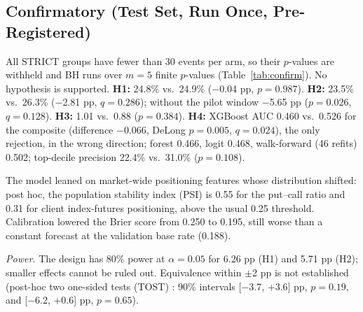 \documentclass[conference]{IEEEtran}
\newcommand{\HOneExp}{24.8}
\newcommand{\HOneRest}{24.9}
\newcommand{\HOneDiff}{\ensuremath{-}0.04}
\newcommand{\HOneP}{0.987}
\newcommand{\HTwoExp}{23.5}
\newcommand{\HTwoRest}{26.3}
\newcommand{\HTwoDiff}{\ensuremath{-}2.81}
\newcommand{\HTwoQ}{0.286}
\newcommand{\HThreeExp}{1.01}
\newcommand{\HThreeRest}{0.88}
\newcommand{\HThreeP}{0.384}
\newcommand{\AUCxgb}{0.460}
\newcommand{\AUCrf}{0.466}
\newcommand{\AUClogit}{0.468}
\newcommand{\AUCcomp}{0.526}
\newcommand{\HFourDiff}{\ensuremath{-}0.066}
\newcommand{\HFourP}{0.005}
\newcommand{\HFourQ}{0.024}
\newcommand{\TopMLPrec}{22.4}
\newcommand{\TopCompPrec}{31.0}
\newcommand{\TopP}{0.108}
\newcommand{\BrierRaw}{0.250}
\newcommand{\BrierCal}{0.195}
\newcommand{\WFAUC}{0.502}
\newcommand{\WFMonths}{46}
\newcommand{\NPHTwoDiff}{\ensuremath{-}5.65}
\newcommand{\NPHTwoP}{0.026}
\newcommand{\NPHTwoQ}{0.128}
\newcommand{\BHm}{5}
\newcommand{\TostHOneLo}{\ensuremath{-}3.7}
\newcommand{\TostHOneHi}{+3.6}
\newcommand{\TostHOneP}{0.19}
\newcommand{\TostHTwoLo}{\ensuremath{-}6.2}
\newcommand{\TostHTwoHi}{+0.6}
\newcommand{\TostHTwoP}{0.65}
\newcommand{\MDEHOne}{6.26}
\newcommand{\MDEHTwo}{5.71}
\newcommand{\PSIpcr}{0.55}
\newcommand{\PSIclient}{0.31}
\newcommand{\BrierConstVal}{0.188}
\begin{document}
\subsection{Confirmatory (Test Set, Run Once, Pre-Registered)}
All STRICT groups have fewer than 30 events per arm, so their $p$-values are withheld and BH runs over
$m=\BHm$ finite $p$-values (Table~\ref{tab:confirm}). No hypothesis is supported. \textbf{H1:} \HOneExp\% vs.\
\HOneRest\% (\HOneDiff{} pp, $p=\HOneP$). \textbf{H2:} \HTwoExp\% vs.\ \HTwoRest\% (\HTwoDiff{} pp,
$q=\HTwoQ$); without the pilot window \NPHTwoDiff{} pp ($p=\NPHTwoP$, $q=\NPHTwoQ$). \textbf{H3:}
\HThreeExp{} vs.\ \HThreeRest{} ($p=\HThreeP$). \textbf{H4:} XGBoost AUC \AUCxgb{} vs.\ \AUCcomp{} for the
composite (difference \HFourDiff, DeLong $p=\HFourP$, $q=\HFourQ$), the only rejection, in the wrong
direction; forest \AUCrf, logit \AUClogit, walk-forward (\WFMonths{} refits) \WFAUC; top-decile precision
\TopMLPrec\% vs.\ \TopCompPrec\% ($p=\TopP$).

The model leaned on market-wide positioning features whose distribution shifted: post hoc, the population
stability index (PSI) is \PSIpcr{} for the put--call ratio and \PSIclient{} for client index-futures
positioning, above the usual 0.25 threshold. Calibration lowered the Brier score \cite{brier1950} from
\BrierRaw{} to \BrierCal, still worse than a constant forecast at the validation base rate (\BrierConstVal).

\emph{Power.} The design has 80\% power at $\alpha=0.05$ for \MDEHOne{} pp (H1) and \MDEHTwo{} pp (H2);
smaller effects cannot be ruled out. Equivalence within $\pm$2 pp is not established (post-hoc two one-sided
tests (TOST) \cite{lakens2017}: 90\% intervals [\TostHOneLo, \TostHOneHi] pp, $p=\TostHOneP$, and
[\TostHTwoLo, \TostHTwoHi] pp, $p=\TostHTwoP$).
\end{document}
